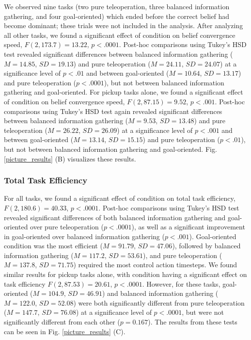 \documentclass[conference]{IEEEtran}
\begin{document}
We observed nine tasks (two pure teleoperation, three balanced information gathering, and four goal-oriented) which ended before the correct belief had become dominant; these trials were not included in the analysis. After analyzing all other tasks, we found a significant effect of condition on belief convergence speed, $F(2, 173.7) = 13.22$, $p < .0001$. Post-hoc comparisons using Tukey's HSD test revealed significant differences between balanced information gathering ($M = 14.85$, $SD = 19.13$) and pure teleoperation ($M = 24.11$, $SD = 24.07$) at a significance level of $p < .01$ and between goal-oriented ($M = 10.64$, $SD = 13.17$) and pure teleoperation ($p < .0001$), but not between balanced information gathering and goal-oriented. For pickup tasks alone, we found a significant effect of condition on belief convergence speed, $F(2, 87.15) = 9.52$, $p < .001$. Post-hoc comparisons using Tukey's HSD test again revealed significant differences between balanced information gathering ($M = 9.53$, $SD = 13.48$) and pure teleoperation ($M = 26.22$, $SD = 26.09$) at a significance level of $p < .001$ and between goal-oriented ($M = 13.14$, $SD = 15.15$) and pure teleoperation ($p < .01$), but not between balanced information gathering and goal-oriented. Fig. \ref{picture_results} (B) visualizes these results.

\subsubsection{Total Task Efficiency}

For all tasks, we found a significant effect of condition on total task efficiency, $F(2, 180.6) = 40.33$, $p < .0001$. Post-hoc comparisons using Tukey's HSD test revealed significant differences of both balanced information gathering and goal-oriented over pure teleoperation ($p < .0001$), as well as a significant improvement in goal-oriented over balanced information gathering ($p < .001$). Goal-oriented condition was the most efficient ($M = 91.79$, $SD = 47.06$), followed by balanced information gathering ($M = 117.2$, $SD = 53.61$), and pure teleoperation ($M = 137.8$, $SD = 71.75$) required the most control action timesteps. We found similar results for pickup tasks alone, with condition having a significant effect on task efficiency $F(2, 87.53) = 20.61$, $p < .0001$. However, for these tasks, goal-oriented ($M = 104.9$, $SD = 46.91$) and balanced information gathering ($M = 122.0$, $SD = 52.08$) were both significantly different from pure teleoperation ($M = 147.7$, $SD = 76.08$) at a significance level of $p < .0001$, but were not significantly different from each other ($p = 0.167$). The results from these tests can be seen in Fig. \ref{picture_results} (C).
\end{document}
